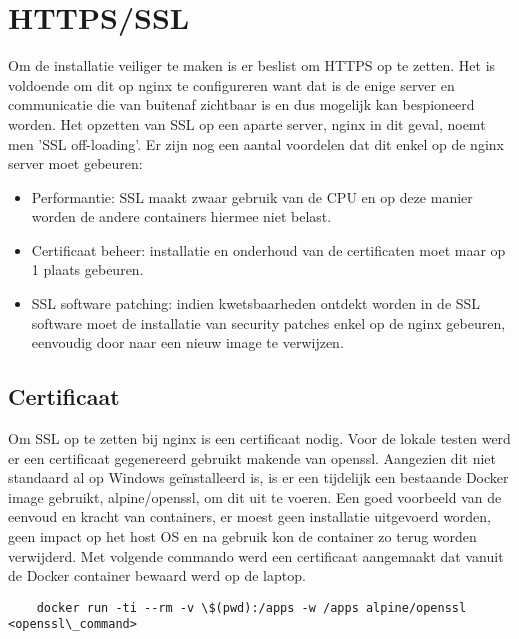 \section{HTTPS/SSL}
Om de installatie veiliger te maken is er beslist om HTTPS op te zetten. Het is voldoende om dit op nginx te configureren want dat is de enige server en communicatie die van buitenaf zichtbaar is en dus mogelijk kan bespioneerd worden. Het opzetten van SSL op een aparte server, nginx in dit geval, noemt men 'SSL off-loading'.
\newline
Er zijn nog een aantal voordelen dat dit enkel op de nginx server moet gebeuren:
\newline
\begin{itemize}
    \item Performantie: SSL maakt zwaar gebruik van de CPU en op deze manier worden de andere containers hiermee niet belast.
    \item Certificaat beheer: installatie en onderhoud van de certificaten moet maar op 1 plaats gebeuren.
    \item SSL software patching: indien kwetsbaarheden ontdekt worden in de SSL software moet de installatie van security patches enkel op de nginx gebeuren, eenvoudig door naar een nieuw image te verwijzen.
\end{itemize}



\subsection{Certificaat}
Om SSL op te zetten bij nginx is een certificaat nodig. Voor de lokale testen werd er een certificaat gegenereerd gebruikt makende van openssl. Aangezien dit niet standaard al op Windows geïnstalleerd is, is er een tijdelijk een bestaande Docker image gebruikt, alpine/openssl, om dit uit te voeren. Een goed voorbeeld van de eenvoud en kracht van containers, er moest geen installatie uitgevoerd worden, geen impact op het host OS en na gebruik kon de container zo terug worden verwijderd.
\newline
\newline
Met volgende commando werd een certificaat aangemaakt dat vanuit de Docker container bewaard werd op de laptop.
\newline
\newline
\begin{lstlisting}
    docker run -ti --rm -v \$(pwd):/apps -w /apps alpine/openssl <openssl\_command>
\end{lstlisting}

